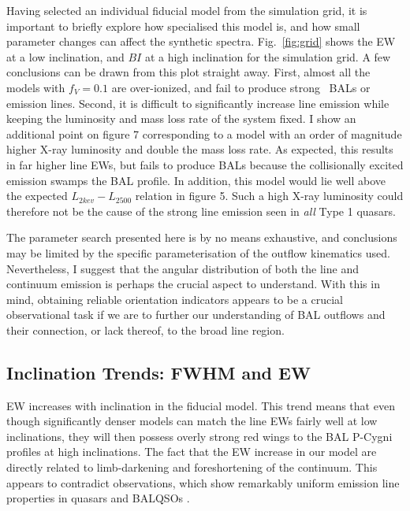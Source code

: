 Having selected an individual fiducial model from the simulation grid, it is important
to briefly explore how specialised this model is, and how small parameter
changes can affect the synthetic spectra. Fig.~\ref{fig:grid}
shows the EW at a low inclination, and $BI$ at a high inclination for the simulation
grid. A few conclusions can be drawn from this plot straight away. 
First, almost all the models with 
$f_V=0.1$ are over-ionized, and 
fail to produce strong \civ\ BALs or emission lines. Second,  
it is difficult to significantly increase line emission while
keeping the luminosity and mass loss rate of the system fixed. 
I show an additional point on figure 7 corresponding to a 
model with an order of
magnitude higher X-ray luminosity and double the mass loss rate. As expected, 
this results in far higher line EWs, but fails to produce BALs because
the collisionally excited emission swamps the BAL profile. In addition,
this model would lie well above the expected $L_{2kev}-L_{2500}$ 
relation in figure 5. Such a high X-ray luminosity could therefore 
not be the cause of the strong line emission seen in {\em all} Type 1 quasars.

The parameter search presented here is by no means exhaustive, and
conclusions may be limited by the specific parameterisation of the outflow 
kinematics used. Nevertheless, I suggest that the angular distribution
of both the line and continuum emission is perhaps the crucial 
aspect to understand. With this in mind, obtaining reliable orientation 
indicators appears to be a crucial observational task if we are to
further our understanding of BAL outflows 
and their connection, or lack thereof, to the 
broad line region. 

\subsection{Inclination Trends: FWHM and EW}
\label{sec:ew_in_model}

EW increases with inclination in the fiducial model.
This trend means that even though significantly denser
models can match the line EWs fairly well at low inclinations, they will then
possess overly strong red wings to the BAL P-Cygni profiles at high inclinations.
The fact that the EW increase in our model are directly related to limb-darkening 
and foreshortening of the continuum. 
This appears to contradict observations, which show remarkably uniform emission
line properties in quasars and BALQSOs \citep{weymann1991,dipompeo2012b}. 

